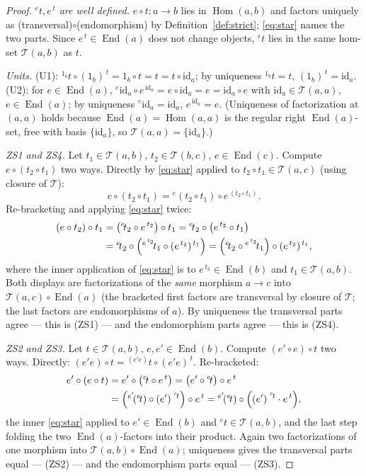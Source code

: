 \documentclass[11pt]{article}
\theoremstyle{definition}
\newcommand{\Hom}{\operatorname{Hom}}
\newcommand{\End}{\operatorname{End}}
\newcommand{\id}{\mathrm{id}}
\newcommand{\T}{\mathcal{T}}
\newcommand{\lact}[2]{{}^{#1}\!#2}      %
\newcommand{\rest}[2]{#1^{\,#2}}        %
\begin{document}
\begin{proof}
\emph{$\lact{e}{t},\rest{e}{t}$ are well defined.} $e\circ t:a\to b$ lies in
$\Hom(a,b)$ and factors uniquely as (transversal)$\circ$(endomorphism) by
Definition~\ref{def:strict}; \eqref{eq:star} names the two parts. Since
$\rest{e}{t}\in\End(a)$ does not change objects, $\lact{e}{t}$ lies in the same
hom-set $\T(a,b)$ as $t$.

\emph{Units.} (U1): $\lact{1_b}{t}\circ\rest{(1_b)}{t}=1_b\circ t=t=t\circ\id_a$;
by uniqueness $\lact{1_b}{t}=t$, $\rest{(1_b)}{t}=\id_a$. (U2): for $e\in\End(a)$,
$\lact{e}{\id_a}\circ\rest{e}{\id_a}=e\circ\id_a=e=\id_a\circ e$ with
$\id_a\in\T(a,a)$, $e\in\End(a)$; by uniqueness $\lact{e}{\id_a}=\id_a$,
$\rest{e}{\id_a}=e$. (Uniqueness of factorization at $(a,a)$ holds because
$\End(a)=\Hom(a,a)$ is the regular right $\End(a)$-set, free with basis
$\{\id_a\}$, so $\T(a,a)=\{\id_a\}$.)

\emph{ZS1 and ZS4.} Let $t_1\in\T(a,b)$, $t_2\in\T(b,c)$, $e\in\End(c)$. Compute
$e\circ(t_2\circ t_1)$ two ways. Directly by \eqref{eq:star} applied to
$t_2\circ t_1\in\T(a,c)$ (using closure of $\T$):
\[
  e\circ(t_2\circ t_1)=\lact{e}{(t_2\circ t_1)}\circ\rest{e}{(t_2\circ t_1)} .
\]
Re-bracketing and applying \eqref{eq:star} twice:
\begin{align*}
  (e\circ t_2)\circ t_1
  &=\bigl(\lact{e}{t_2}\circ\rest{e}{t_2}\bigr)\circ t_1
   =\lact{e}{t_2}\circ\bigl(\rest{e}{t_2}\circ t_1\bigr)\\
  &=\lact{e}{t_2}\circ\Bigl(\lact{\rest{e}{t_2}}{t_1}\circ
     \rest{(\rest{e}{t_2})}{t_1}\Bigr)
   =\Bigl(\lact{e}{t_2}\circ\lact{\rest{e}{t_2}}{t_1}\Bigr)\circ
     \rest{(\rest{e}{t_2})}{t_1},
\end{align*}
where the inner application of \eqref{eq:star} is to $\rest{e}{t_2}\in\End(b)$ and
$t_1\in\T(a,b)$. Both displays are factorizations of the \emph{same} morphism
$a\to c$ into $\T(a,c)\circ\End(a)$ (the bracketed first factors are transversal
by closure of $\T$; the last factors are endomorphisms of $a$). By uniqueness the
transversal parts agree --- this is (ZS1) --- and the endomorphism parts agree ---
this is (ZS4).

\emph{ZS2 and ZS3.} Let $t\in\T(a,b)$, $e,e'\in\End(b)$. Compute $(e'\circ e)\circ
t$ two ways. Directly:
$(e'e)\circ t=\lact{(e'e)}{t}\circ\rest{(e'e)}{t}$. Re-bracketed:
\begin{align*}
  e'\circ(e\circ t)
  &=e'\circ\bigl(\lact{e}{t}\circ\rest{e}{t}\bigr)
   =\bigl(e'\circ\lact{e}{t}\bigr)\circ\rest{e}{t}\\
  &=\Bigl(\lact{e'}{(\lact{e}{t})}\circ\rest{(e')}{\,\lact{e}{t}}\Bigr)\circ
     \rest{e}{t}
   =\lact{e'}{(\lact{e}{t})}\circ\Bigl(\rest{(e')}{\,\lact{e}{t}}\cdot
     \rest{e}{t}\Bigr),
\end{align*}
the inner \eqref{eq:star} applied to $e'\in\End(b)$ and
$\lact{e}{t}\in\T(a,b)$, and the last step folding the two $\End(a)$-factors into
their product. Again two factorizations of one morphism into
$\T(a,b)\circ\End(a)$; uniqueness gives the transversal parts equal --- (ZS2) ---
and the endomorphism parts equal --- (ZS3).


\end{proof}
\end{document}

